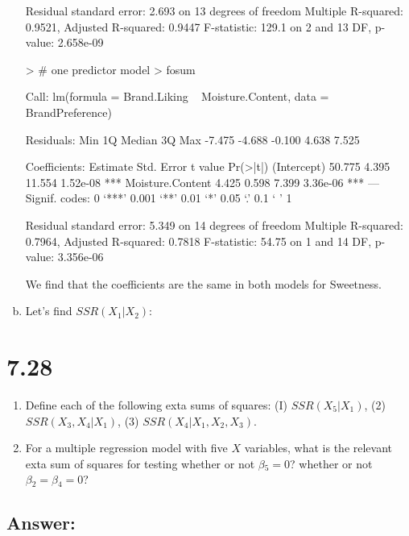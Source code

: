 \documentclass{article}
\begin{document}
\begin{enumerate}[a)]
\begin{Schunk}
\begin{Soutput}
Residual standard error: 2.693 on 13 degrees of freedom
Multiple R-squared:  0.9521,	Adjusted R-squared:  0.9447 
F-statistic: 129.1 on 2 and 13 DF,  p-value: 2.658e-09
\end{Soutput}
\begin{Sinput}
> # one predictor model
> fosum
\end{Sinput}
\begin{Soutput}
Call:
lm(formula = Brand.Liking ~ Moisture.Content, data = BrandPreference)

Residuals:
   Min     1Q Median     3Q    Max 
-7.475 -4.688 -0.100  4.638  7.525 

Coefficients:
                 Estimate Std. Error t value Pr(>|t|)    
(Intercept)        50.775      4.395  11.554 1.52e-08 ***
Moisture.Content    4.425      0.598   7.399 3.36e-06 ***
---
Signif. codes:  0 ‘***’ 0.001 ‘**’ 0.01 ‘*’ 0.05 ‘.’ 0.1 ‘ ’ 1

Residual standard error: 5.349 on 14 degrees of freedom
Multiple R-squared:  0.7964,	Adjusted R-squared:  0.7818 
F-statistic: 54.75 on 1 and 14 DF,  p-value: 3.356e-06
\end{Soutput}
\end{Schunk}

We find that the coefficients are the same in both models for Sweetness.

\item{} Let's find $SSR(X_1|X_2)$:

\end{enumerate}

\section{7.28}

\begin{enumerate}[a]
\item{} Define each of the following exta sums of squares: (I) $SSR(X_5|X_1)$, (2) $SSR(X_3,X_4|X_1)$, (3) $SSR(X_4|X_1,X_2,X_3)$.
\item{} For a multiple regression model with five $X$ variables, what is the relevant exta sum of squares for testing whether or not $\beta{}_5 = 0$? whether or not $\beta{}_2 = \beta{}_4 = 0$?
\end{enumerate}

\subsection{Answer:}
\end{document}
